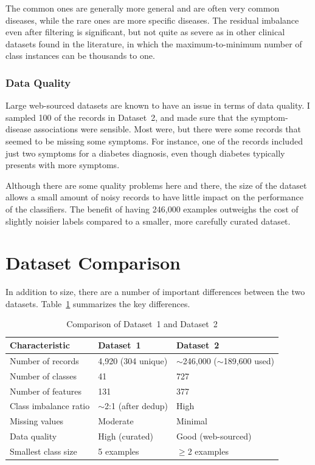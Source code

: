 The common ones are generally more general and are often very common diseases, while the rare ones are more specific diseases. The residual imbalance even after filtering is significant, but not quite as severe as in other clinical datasets found in the literature, in which the maximum-to-minimum number of class instances can be thousands to one.

\subsubsection{Data Quality}

Large web-sourced datasets are known to have an issue in terms of data quality. I sampled 100 of the records in Dataset~2, and made sure that the symptom-disease associations were sensible. Most were, but there were some records that seemed to be missing some symptoms. For instance, one of the records included just two symptoms for a diabetes diagnosis, even though diabetes typically presents with more symptoms.

Although there are some quality problems here and there, the size of the dataset allows a small amount of noisy records to have little impact on the performance of the classifiers. The benefit of having 246{,}000 examples outweighs the cost of slightly noisier labels compared to a smaller, more carefully curated dataset.

\section{Dataset Comparison}
\label{sec:dataset_comparison}

In addition to size, there are a number of important differences between the two datasets. Table~\ref{tab:dataset_comparison} summarizes the key differences.

\begin{table}[H]
\centering
\caption{Comparison of Dataset~1 and Dataset~2}
\label{tab:dataset_comparison}
\begin{tabular}{@{}lll@{}}
\toprule
\textbf{Characteristic} & \textbf{Dataset~1} & \textbf{Dataset~2} \\
\midrule
Number of records & 4,920 (304 unique) & $\sim$246,000 ($\sim$189,600 used) \\
Number of classes & 41 & 727 \\
Number of features & 131 & 377 \\
Class imbalance ratio & $\sim$2:1 (after dedup) & High \\
Missing values & Moderate & Minimal \\
Data quality & High (curated) & Good (web-sourced) \\
Smallest class size & 5 examples & $\geq$2 examples \\
\bottomrule
\end{tabular}
\end{table}

